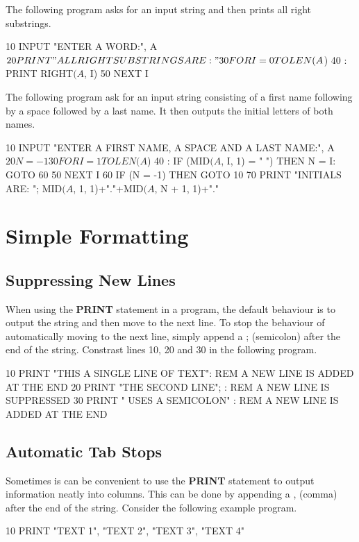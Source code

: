The following program asks for an input string and then prints all right substrings.
\begin{screencode}
10 INPUT "ENTER A WORD:", A$
20 PRINT "ALL RIGHT SUBSTRINGS ARE:"
30 FOR I = 0 TO LEN(A$)
40 :  PRINT RIGHT$(A$, I)
50 NEXT I
\end{screencode}

The following program ask for an input string consisting of a first name following by a space followed by a last name. It then outputs the initial letters of both names.
\begin{screencode}
10 INPUT "ENTER A FIRST NAME, A SPACE AND A LAST NAME:", A$
20 N = -1
30 FOR I = 1 TO LEN(A$)
40 :  IF (MID$(A$, I, 1) = " ") THEN N = I: GOTO 60
50 NEXT I
60 IF (N = -1) THEN GOTO 10
70 PRINT "INITIALS ARE: "; MID$(A$, 1, 1)+"."+MID$(A$, N + 1, 1)+"."
\end{screencode}

\section{Simple Formatting}

\subsection{Suppressing New Lines}
When using the {\bf PRINT} statement in a program, the default behaviour is to output the string and then move to the next line. To stop the behaviour of automatically moving to the next line, simply append a ; (semicolon) after the end of the string. Constrast lines 10, 20 and 30 in the following program.

\begin{screencode}
10 PRINT "THIS A SINGLE LINE OF TEXT": REM A NEW LINE IS ADDED AT THE END
20 PRINT "THE SECOND LINE"; : REM A NEW LINE IS SUPPRESSED
30 PRINT " USES A SEMICOLON" : REM A NEW LINE IS ADDED AT THE END
\end{screencode}

\subsection{Automatic Tab Stops}
Sometimes is can be convenient to use the {\bf PRINT} statement to output information neatly into columns. This can be done by appending a , (comma) after the end of the string. Consider the following example program.

\begin{screencode}
10 PRINT "TEXT 1", "TEXT 2", "TEXT 3", "TEXT 4"
\end{screencode}

